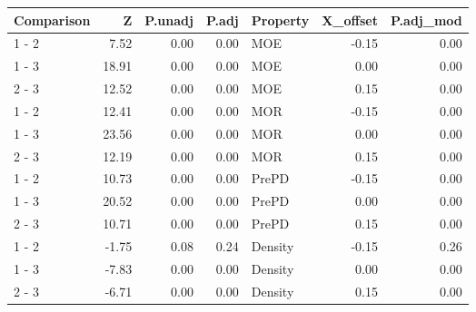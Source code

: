 \begin{table}[ht]
\centering
\begin{tabular}{lrrrlrr}
  \hline
Comparison & Z & P.unadj & P.adj & Property & X\_offset & P.adj\_mod \\ 
  \hline
1 - 2 & 7.52 & 0.00 & 0.00 & MOE & -0.15 & 0.00 \\ 
  1 - 3 & 18.91 & 0.00 & 0.00 & MOE & 0.00 & 0.00 \\ 
  2 - 3 & 12.52 & 0.00 & 0.00 & MOE & 0.15 & 0.00 \\ 
  1 - 2 & 12.41 & 0.00 & 0.00 & MOR & -0.15 & 0.00 \\ 
  1 - 3 & 23.56 & 0.00 & 0.00 & MOR & 0.00 & 0.00 \\ 
  2 - 3 & 12.19 & 0.00 & 0.00 & MOR & 0.15 & 0.00 \\ 
  1 - 2 & 10.73 & 0.00 & 0.00 & PrePD & -0.15 & 0.00 \\ 
  1 - 3 & 20.52 & 0.00 & 0.00 & PrePD & 0.00 & 0.00 \\ 
  2 - 3 & 10.71 & 0.00 & 0.00 & PrePD & 0.15 & 0.00 \\ 
  1 - 2 & -1.75 & 0.08 & 0.24 & Density & -0.15 & 0.26 \\ 
  1 - 3 & -7.83 & 0.00 & 0.00 & Density & 0.00 & 0.00 \\ 
  2 - 3 & -6.71 & 0.00 & 0.00 & Density & 0.15 & 0.00 \\ 
   \hline
\end{tabular}
\end{table}
